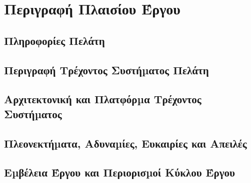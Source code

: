 \section{Περιγραφή Πλαισίου Έργου}

	\subsection{Πληροφορίες Πελάτη}
	\subsection{Περιγραφή Τρέχοντος Συστήµατος Πελάτη}
	\subsection{Αρχιτεκτονική και Πλατφόρµα Τρέχοντος Συστήµατος}
	\subsection{Πλεονεκτήµατα, Αδυναµίες, Ευκαιρίες και Απειλές}
	\subsection{Εµβέλεια Έργου και Περιορισµοί Κύκλου Έργου}